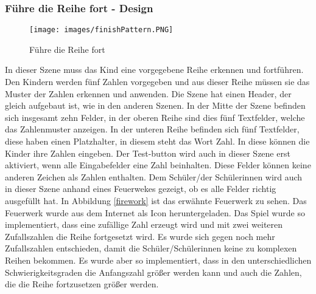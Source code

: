 \subsubsection{Führe die Reihe fort - Design}
\begin{figure}[htbp]
  \centering
  \texttt{[image: images/finishPattern.PNG]}
  \caption{Führe die Reihe fort}
  \label{finishPattern}
\end{figure}
In dieser Szene muss das Kind eine vorgegebene Reihe erkennen und fortführen. Den Kindern werden fünf Zahlen vorgegeben und aus dieser Reihe müssen sie das Muster der Zahlen erkennen und anwenden. Die Szene hat einen Header, der gleich aufgebaut ist, wie in den anderen Szenen. In der Mitte der Szene befinden sich insgesamt zehn Felder, in der oberen Reihe sind dies fünf Textfelder, welche das Zahlenmuster anzeigen. In der unteren Reihe befinden sich fünf Textfelder, diese haben einen Platzhalter, in diesem steht das Wort Zahl. In diese können die Kinder ihre Zahlen eingeben. Der Test-button wird auch in dieser Szene erst aktiviert, wenn alle Eingabefelder eine Zahl beinhalten. Diese Felder können keine anderen Zeichen als Zahlen enthalten. Dem Schüler/der Schülerinnen wird auch in dieser Szene anhand eines Feuerwekes gezeigt, ob es alle Felder richtig ausgefüllt hat. In Abbildung \ref{firework} ist das erwähnte Feuerwerk zu sehen. Das Feuerwerk wurde aus dem Internet als Icon heruntergeladen\autocite{firework}. Das Spiel wurde so implementiert, dass eine zufällige Zahl erzeugt wird und mit zwei weiteren Zufallszahlen die Reihe fortgesetzt wird. Es wurde sich gegen noch mehr Zufallszahlen entschieden, damit die Schüler/Schülerinnen keine zu komplexen Reihen bekommen. Es wurde aber so implementiert, dass in den unterschiedlichen Schwierigkeitsgraden die Anfangszahl größer werden kann und auch die Zahlen, die die Reihe fortzusetzen größer werden.
